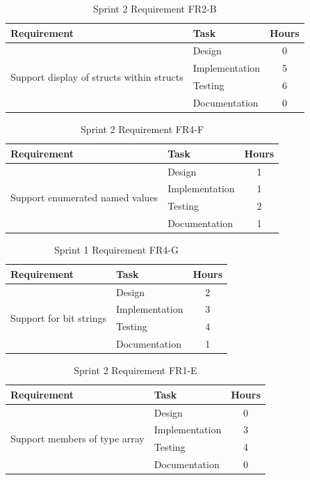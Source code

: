 \begin{table}[!ht] \small \center
\caption{Sprint 2 Requirement FR2-B\label{tab:sp2_req2b}}
\begin{tabular}{l l c}
	\toprule
	Requirement & Task & Hours \\
	\midrule
	\multirow{4}{5cm}{Support display of structs within structs	} & Design & 0\\
	& Implementation & 5 \\
	& Testing & 6 \\
	& Documentation & 0 \\
	\bottomrule
\end{tabular}
\end{table}

\begin{table}[!ht] \small \center
\caption{Sprint 2 Requirement FR4-F\label{tab:sp2_req4f}}
\begin{tabular}{l l c}
	\toprule
	Requirement & Task & Hours \\
	\midrule
	\multirow{4}{5cm}{Support enumerated named values} & Design & 1 \\
	& Implementation & 1 \\
	& Testing & 2 \\
	& Documentation & 1 \\
	\bottomrule
\end{tabular}
\end{table}

\begin{table}[!ht] \small \center
\caption{Sprint 1 Requirement FR4-G\label{tab:sp2_req4g}}
\begin{tabular}{l l c}
	\toprule
	Requirement & Task & Hours \\
	\midrule
	\multirow{4}{5cm}{Support for bit strings} & Design & 2 \\
	& Implementation & 3 \\
	& Testing & 4 \\
	& Documentation & 1 \\
	\bottomrule
\end{tabular}
\end{table}

\begin{table}[!ht] \small \center
\caption{Sprint 2 Requirement FR1-E\label{tab:sp2_req1e}}
\begin{tabular}{l l c}
	\toprule
	Requirement & Task & Hours \\
	\midrule
	\multirow{4}{5cm}{Support members of type array} & Design & 0 \\
	& Implementation & 3 \\
	& Testing & 4 \\
	& Documentation & 0 \\
	\bottomrule
\end{tabular}
\end{table}

